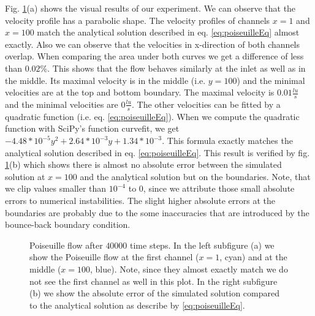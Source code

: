 \documentclass[a4paper,11pt, footsepline]{book}
\begin{document}
Fig. \ref{fig:Poiseuille_vectors}(a) shows the visual results of our experiment. We can observe that the velocity profile has a parabolic shape. The velocity profiles of channels $x=1$ and $x=100$  match the analytical solution described in eq. \ref{eq:poiseuilleEq} almost exactly. Also we can observe that the velocities in x-direction of both channels overlap. When comparing the area under both curves we get a difference of less than $0.02\%$. This shows that the flow behaves similarly at the inlet as well as in the middle. Its maximal velocity is in the middle (i.e. $y=100$) and the minimal velocities are at the top and bottom boundary. The maximal velocity is $0.01\frac{lu}{s}$ and the minimal velocities are $0\frac{lu}{s}$. The other velocities can be fitted by a quadratic function (i.e. eq. \ref{eq:poiseuilleEq}). When we compute the quadratic function with SciPy's function \textsf{curve\textunderscore fit}, we get $-4.48*10^{-5}y^{2}+2.64*10^{-3}y+1.34*10^{-3}$. This formula exactly matches the analytical solution described in eq. \ref{eq:poiseuilleEq}. This result is verified by fig. \ref{fig:Poiseuille_vectors}(b) which shows there is almost no absolute error between the simulated solution at $x=100$ and the analytical solution but on the boundaries. Note, that we clip values smaller than $10^{-4}$ to $0$, since we attribute those small absolute errors to numerical instabilities. The slight higher absolute errors at the boundaries are probably due to the some inaccuracies that are introduced by the bounce-back boundary condition. \cite{Kruger.2016}
\begin{figure}
  \begin{center}
   \caption{Poiseuille flow after $40000$ time steps. In the left subfigure (a) we show the Poiseuille flow at the first channel ($x=1$, cyan) and at the middle ($x=100$, blue). Note, since they almost exactly match we do not see the first channel as well in this plot. In the right subfigure (b) we show the absolute error of the simulated solution compared to the analytical solution as describe by \ref{eq:poiseuilleEq}.}
  \label{fig:Poiseuille_vectors}
  \end{center}
\end{figure}
\end{document}
